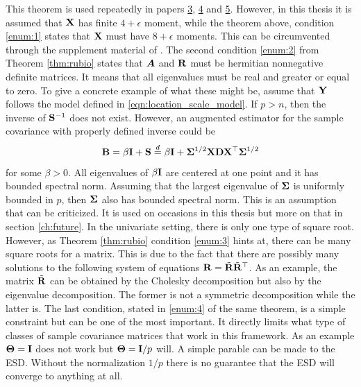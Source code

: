 \documentclass[12pt, oneside]{book}\usepackage{knitr}
\begin{document}
This theorem is used repeatedly in papers \hyperref[sec:paper3]{3}, \hyperref[sec:paper4]{4} and \hyperref[sec:paper5]{5}.
However, in this thesis it is assumed that $\mathbf{X}$ has finite $4+\epsilon$ moment, while the theorem above, condition \eqref{enum:1} states that $\mathbf{X}$ must have $8+\epsilon$ moments. 
This can be circumvented through the supplement material of \citet{BodnarGuptaParolya2016}.
The second condition \eqref{enum:2} from Theorem \ref{thm:rubio} states that $\mbox{\boldmath$A$}$ and $\mathbf{R}$ must be hermitian nonnegative definite matrices.
It means that all eigenvalues must be real and greater or equal to zero.
To give a concrete example of what these might be, assume that $\mathbf{Y}$ follows the model defined in \eqref{eqn:location_scale_model}.
If $p>n$, then the inverse of $\mathbf{S}^{-1}$ does not exist.
However, an augmented estimator for the sample covariance with properly defined inverse could be 
\begin{equation}\label{eqn:bb}
\mathbf{B} = \beta\mathbf{I} + \mathbf{S} \stackrel{d}{=} \beta \mathbf{I} + \mathbf{\Sigma}^{1/2}\mathbf{X} \mathbf{D} \mathbf{X}^\top \mathbf{\Sigma}^{1/2}
\end{equation}
for some $\beta >0$.
All eigenvalues of $\beta \mathbf{I}$ are centered at one point and it has bounded spectral norm. 
Assuming that the largest eigenvalue of $\mathbf{\Sigma}$ is uniformly bounded in $p$, then $\mathbf{\Sigma}$ also has bounded spectral norm.
This is an assumption that can be criticized.
It is used on occasions in this thesis but more on that in section \ref{ch:future}.
In the univariate setting, there is only one type of square root.
However, as Theorem \ref{thm:rubio} condition \eqref{enum:3} hints at, there can be many square roots for a matrix.
This is due to the fact that there are possibly many solutions to the following system of equations $\mathbf{R} = \tilde{\mathbf{R}} \tilde{\mathbf{R}}^\top$.
As an example, the matrix $\tilde {\mathbf{R}}$ can be obtained by the Cholesky decomposition but also by the eigenvalue decomposition.
The former is not a symmetric decomposition while the latter is.
The last condition, stated in \eqref{enum:4} of the same theorem, is a simple constraint but can be one of the most important. 
It directly limits what type of classes of sample covariance matrices that work in this framework.
As an example $\mathbf{\Theta}=\mathbf{I}$ does not work but $\mathbf{\Theta} = \mathbf{I} / p$ will.
A simple parable can be made to the ESD.
Without the normalization $1/p$ there is no guarantee that the ESD will converge to anything at all.
\end{document}
